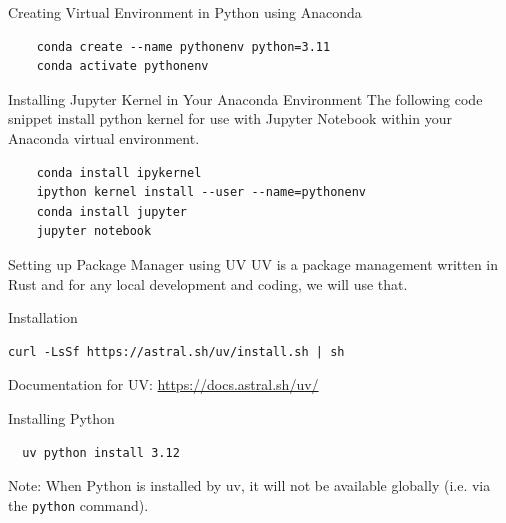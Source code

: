 \documentclass[aspectratio=169,xcolor=dvipsnames,svgnames,x11names,fleqn]{beamer}
\begin{document}
\begin{frame}[containsverbatim]{Creating Virtual Environment in Python using Anaconda}
  \begin{verbatim}
    conda create --name pythonenv python=3.11
    conda activate pythonenv
    \end{verbatim}
\end{frame}

\begin{frame}[containsverbatim]{Installing Jupyter Kernel in Your Anaconda Environment}
  The following code snippet install python kernel for use with Jupyter Notebook within your Anaconda virtual environment.

  \begin{verbatim}
    conda install ipykernel
    ipython kernel install --user --name=pythonenv
    conda install jupyter
    jupyter notebook
    \end{verbatim}
\end{frame}


\begin{frame}[containsverbatim]{Setting up Package Manager using UV}
UV is a package management written in Rust and for any local development and coding, we will use that.

\begin{gradblock}{Installation}

\begin{verbatim}
curl -LsSf https://astral.sh/uv/install.sh | sh
\end{verbatim}

\end{gradblock}

Documentation for UV: \url{https://docs.astral.sh/uv/}


\begin{gradblock}{Installing Python}
  \begin{verbatim}
  uv python install 3.12
  \end{verbatim}

  Note: When Python is installed by uv, it will not be available globally (i.e. via the \texttt{python} command).

\end{gradblock}

\end{frame}
\end{document}
